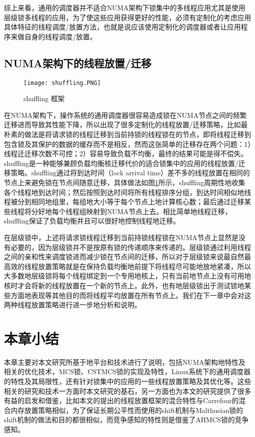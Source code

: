 综上来看，通用的调度器并不适合NUMA架构下锁集中的多线程应用尤其是使用层级锁多线程的应用，为了使这些应用获得更好的性能，必须有定制化的考虑应用具体特征的线程调度/放置方法，也就是说应该使用定制化的调度器或者让应用程序来做自身的线程调度/放置。


\subsection{NUMA架构下的线程放置/迁移}

\begin{figure}[t]
	\centering
	\texttt{[image: shuffling.PNG]}
	\caption{shuffling 框架}
	\label{Fig:shuffling}
\end{figure}
在NUMA架构下，操作系统的通用调度器很容易造成锁在NUMA节点之间的频繁迁移进而导致其性能下降，所以出现了很多定制化的线程放置/迁移策略，比如最朴素的做法是将请求锁的线程迁移到当前持锁的线程锁在的节点，即将线程迁移到包含锁及其保护的数据的缓存而不是相反，然而这张简单的迁移存在两个问题：1）线程迁迁移次数不可控；2）容易导致负载不均衡，最终的结果可能是得不偿失。shuffling\cite{pusukuri2014shuffling}是一种能够兼顾负载均衡核迁移代价的适合锁集中的应用的线程放置/迁移策略。shuffling通过将到达时间（lock arrival time）差不多的线程放置在相同的节点上来避免锁在节点间随意迁移，具体做法如图\ref{Fig:shuffling}所示，shuffling周期性地收集各个线程地到达时间；然后按照到达时间将所有线程排序分组，到达时间相似地线程被分到相同地组里，每组地大小等于每个节点上地计算核心数；最后通过迁移某些线程将分好地每个线程组映射到NUMA节点上去。相比简单地线程迁移，shuffling保证了负载均衡并且可以很好地控制线程地迁移。

在层级锁中，上述将请求锁线程迁移到当前持锁线程锁在NUMA节点上显然是没有必要的，因为层级锁并不是按原有锁的传递顺序来传递的。层级锁通过利用线程之间的亲和性来调度锁进而减少锁在节点间的迁移，所以对于层级锁来说最自然最高效的线程放置策略就是在保持负载均衡地前提下将线程尽可能地放地紧凑，所以大多数地层级锁将每个线程绑定到一个专用地核上，只有当前地节点上没有可用地核时才会将新的线程放置在一个新的节点上。此外，也有地层级锁出于测试锁地某些方面地表现等其他目的而将线程平均放置在所有节点上。我们在下一章中会对这两种线程放置策略进行进一步地分析和说明。

\section{本章小结}
本章主要对本文研究所基于地平台和技术进行了说明，包括NUMA架构地特性及相关的优化技术，MCS锁、CSTMCS锁的实现及特性，Linux系统下的通用调度器的特性及其局限性，还有针对锁集中的应用的一些线程放置策略及其优化等。这些相关的研究和技术一方面时本文研究的基石，另一方面也为本文的研究提供了很多有益的启发和借鉴，比如本文的提出的线程放置框架的混合特性与Carrefour的混合内存放置策略相似，为了保证长期公平性而使用的shift机制与Malthusian锁的shift机制的做法和目的都很相似，而竞争感知的特性则是借鉴了AHMCS锁的竞争感知。